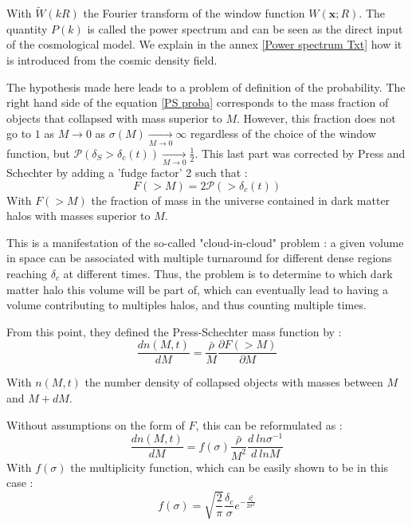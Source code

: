 With $\widetilde{W}(kR)$ the Fourier transform of the window function $W(\textbf{x};R)$. The quantity $P(k)$ is called the power spectrum and can be seen as the direct input of the cosmological model. We explain in the annex \ref{Power spectrum Txt} how it is introduced from the cosmic density field.

The hypothesis made here leads to a problem of definition of the probability. The right hand side of the equation \ref{PS proba} corresponds to the mass fraction of objects that collapsed with mass superior to $M$. However, this fraction does not go to $1$ as $M \rightarrow 0$ as $\sigma(M) \xrightarrow[M \to 0]{} \infty$ regardless of the choice of the window function, but $\mathcal{P}(\delta_S > \delta_c (t)) \xrightarrow[M \to 0]{} \frac{1}{2}$. This last part was corrected by Press and Schechter by adding a 'fudge factor' 2 such that :
\begin{equation}
\label{Fudge}
F(>M) = 2 \mathcal{P}(> \delta_c (t))
\end{equation}
With $F(>M)$ the fraction of mass in the universe contained in dark matter halos with masses superior to $M$.

This is a manifestation of the so-called "cloud-in-cloud" problem : a given volume in space can be associated with multiple turnaround for different dense regions reaching $\delta_c$ at different times. Thus, the problem is to determine to which dark matter halo this volume will be part of, which can eventually lead to having a volume contributing to multiples halos, and thus counting multiple times.


From this point, they defined the Press-Schechter mass function by :
\begin{equation}
\label{PS Mass Function}
\frac{dn(M,t)}{dM} = \frac{\bar{\rho}}{M} \frac{\partial F(>M)}{\partial M}
\end{equation}

With $n(M,t)$ the number density of collapsed objects with masses between $M$ and $M + dM$.

Without assumptions on the form of $F$, this can be reformulated as :
\begin{equation}
\label{Mass function equation}
\frac{dn(M,t)}{dM} = f(\sigma) \frac{\bar{\rho}}{M^2} \frac{d \ ln\sigma^{-1}}{d \ ln M}
\end{equation}
With $f(\sigma)$ the multiplicity function, which can be easily shown to be in this case :
\begin{equation}
\label{Multiplicity}
f(\sigma) = \sqrt{\frac{2}{\pi}} \frac{\delta_c}{\sigma} e^{-\frac{\delta_c^2}{2\sigma^2}}
\end{equation}

